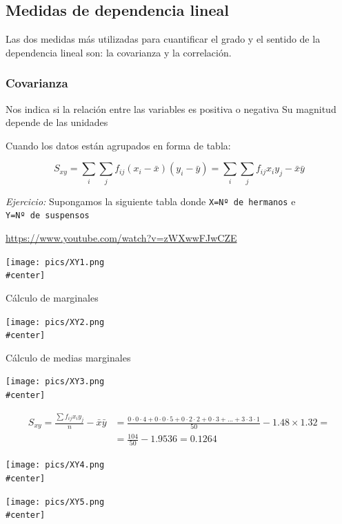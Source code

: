 \documentclass[]{article}
\numberwithin{equation}{section}
\begin{document}
\subsection{Medidas de dependencia
lineal}\label{medidas-de-dependencia-lineal}

Las dos medidas más utilizadas para cuantificar el grado y el sentido de
la dependencia lineal son: la covarianza y la correlación.

\subsubsection{Covarianza}\label{covarianza}

Nos indica si la relación entre las variables es positiva o negativa Su
magnitud depende de las unidades

Cuando los datos están agrupados en forma de tabla:

\[
    S_{xy} = \sum_i \sum_j f_{ij}(x_i-\bar{x})(y_i-\bar{y}) = \sum_i \sum_j f_{ij}x_i y_j - \bar{x}\bar{y}
\]

\emph{Ejercicio:} Supongamos la siguiente tabla donde
\texttt{X=Nº\ de\ hermanos} e \texttt{Y=Nº\ de\ suspensos}

\url{https://www.youtube.com/watch?v=zWXwwFJwCZE}

\texttt{[image: pics/XY1.png\\\#center]}

Cálculo de marginales

\texttt{[image: pics/XY2.png\\\#center]}

Cálculo de medias marginales

\texttt{[image: pics/XY3.png\\\#center]}

\[
\begin{aligned}
      S_{xy} = \frac{\sum f_{ij}x_i y_j}{n} - \bar{x}\bar{y} & = \frac{0\cdot 0 \cdot 4 + 0\cdot 0 \cdot 5 + 0\cdot 2 \cdot 2 + 0\cdot 3  + ... + 3\cdot 3 \cdot 1}{50} - 1.48\times 1.32 = \\
             & = \frac{104}{50} - 1.9536 = 0.1264
\end{aligned}
\]

\texttt{[image: pics/XY4.png\\\#center]}

\texttt{[image: pics/XY5.png\\\#center]}
\end{document}
